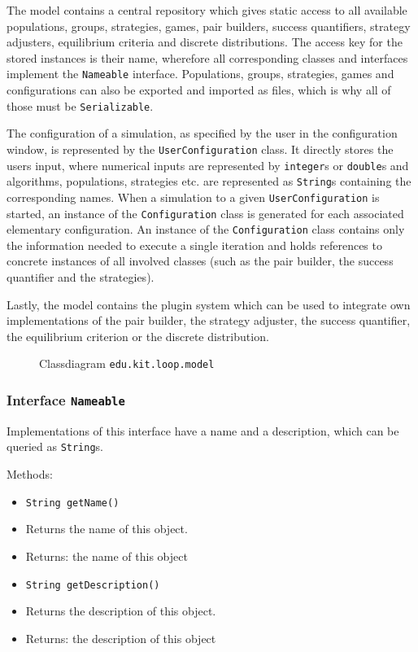\documentclass[parskip=full,11pt]{scrartcl}
\begin{document}
The model contains a central repository which gives static access to all available populations, groups, strategies, games, pair builders, success quantifiers, strategy adjusters, equilibrium criteria and discrete distributions. The access key for the stored instances is their name, wherefore all corresponding classes and interfaces implement the \texttt{Nameable} interface. Populations, groups, strategies, games and configurations can also be exported and imported as files, which is why all of those must be \texttt{Serializable}.

The configuration of a simulation, as specified by the user in the configuration window, is represented by the \texttt{UserConfiguration} class. It directly stores the users input, where numerical inputs are represented by \texttt{integer}s or \texttt{double}s and algorithms, populations, strategies etc. are represented as \texttt{String}s containing the corresponding names. When a simulation to a given \texttt{UserConfiguration} is started, an instance of the \texttt{Configuration} class is generated for each associated elementary configuration. An instance of the \texttt{Configuration} class contains only the information needed to execute a single iteration and holds references to concrete instances of all involved classes (such as the pair builder, the success quantifier and the strategies).

Lastly, the model contains the plugin system which can be used to integrate own implementations of the pair builder, the strategy adjuster, the success quantifier, the equilibrium criterion or the discrete distribution.
\iftrue
\begin{figure}[h]
	\centering
	\fontsize{5}{8}\selectfont
	

	\caption{Classdiagram \texttt{edu.kit.loop.model}}
\end{figure}
\fi
\newpage
\subsubsection{Interface \texttt{Nameable}}

Implementations of this interface have a name and a description, which can be queried as \texttt {String}s.

Methods:
\begin{itemize}\itemsep -10pt
\item \texttt{String getName()}
\item[] Returns the name of this object.
\item[] Returns: the name of this object

\item \texttt{String getDescription()}
\item[] Returns the description of this object.
\item[] Returns: the description of this object
\end{itemize}
\end{document}
